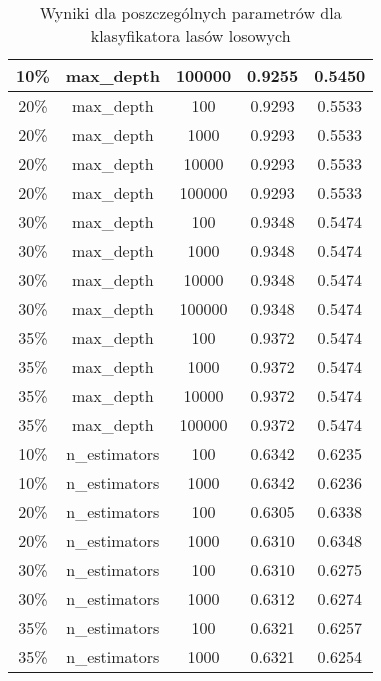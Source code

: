\documentclass{classrep}
\begin{document}
{{{\begin{table}[!htbp]
\begin{tabular}{|c|c|c|c|c|}
                        10\% & max\_depth & 100000 & 0.9255 & 0.5450 \\ \hline
                        20\% & max\_depth & 100 & 0.9293 & 0.5533 \\ \hline
                        20\% & max\_depth & 1000 & 0.9293 & 0.5533 \\ \hline
                        20\% & max\_depth & 10000 & 0.9293 & 0.5533 \\ \hline
                        20\% & max\_depth & 100000 & 0.9293 & 0.5533 \\ \hline
                        30\% & max\_depth & 100 & 0.9348 & 0.5474 \\ \hline
                        30\% & max\_depth & 1000 & 0.9348 & 0.5474 \\ \hline
                        30\% & max\_depth & 10000 & 0.9348 & 0.5474 \\ \hline
                        30\% & max\_depth & 100000 & 0.9348 & 0.5474 \\ \hline
                        35\% & max\_depth & 100 & 0.9372 & 0.5474 \\ \hline
                        35\% & max\_depth & 1000 & 0.9372 & 0.5474 \\ \hline
                        35\% & max\_depth & 10000 & 0.9372 & 0.5474 \\ \hline
                        35\% & max\_depth & 100000 & 0.9372 & 0.5474 \\ \hline
                        10\% & n\_estimators & 100 & 0.6342 & 0.6235 \\ \hline
                        10\% & n\_estimators & 1000 & 0.6342 & 0.6236 \\ \hline
                        20\% & n\_estimators & 100 & 0.6305 & 0.6338 \\ \hline
                        20\% & n\_estimators & 1000 & 0.6310 & 0.6348 \\ \hline
                        30\% & n\_estimators & 100 & 0.6310 & 0.6275 \\ \hline
                        30\% & n\_estimators & 1000 & 0.6312 & 0.6274 \\ \hline
                        35\% & n\_estimators & 100 & 0.6321 & 0.6257 \\ \hline
                        35\% & n\_estimators & 1000 & 0.6321 & 0.6254 \\ \hline
                    \end{tabular}
                    \caption{Wyniki dla poszczególnych parametrów dla klasyfikatora lasów losowych}
                    \label{tab:params_forest_1}
                \end{table}

}}}
\end{document}
